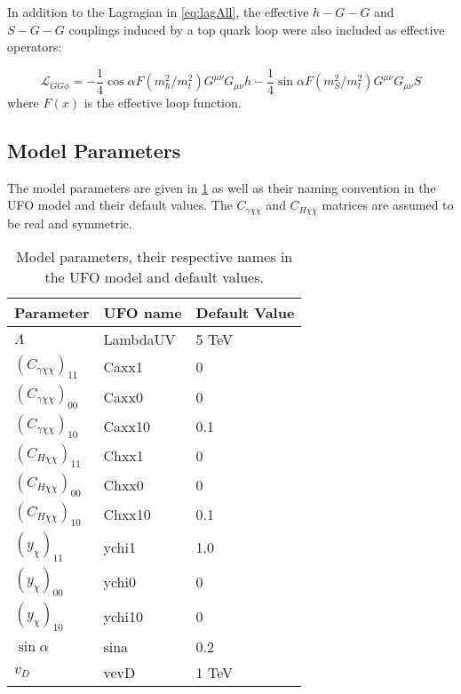 \documentclass[a4paper,11pt]{article}
\begin{document}
In addition to the Lagragian in \cref{eq:lagAll}, the effective $h-G-G$ and $S-G-G$ couplings induced by a top quark loop were also included as effective operators:

\begin{equation*}
	\mathcal{L}_{GG\phi} = -\frac{1}{4} \cos\alpha F(m_h^2/m_t^2) G^{\mu\nu} G_{\mu\nu} h -\frac{1}{4} \sin\alpha F(m_S^2/m_t^2) G^{\mu\nu} G_{\mu\nu} S
\end{equation*}
where $F(x)$ is the effective loop function.
\subsection*{Model Parameters}

The model parameters are given in \cref{tab:parameters} as well as their naming convention in the UFO model and their default values. The $C_{\gamma \chi\chi}$ and $C_{H \chi\chi}$ matrices are assumed to be real and symmetric.


\begin{table}[h!]   \centering
	\vspace{0.2cm}
	\caption{Model parameters, their respective names in the UFO model and default values.\label{tab:parameters}}
	\begin{tabular}{p{2cm}|p{3cm}|p{3cm}}
		\toprule
		\textbf{Parameter} & \textbf{UFO name} & \textbf{Default Value}\\ \toprule 
		$\Lambda$  & LambdaUV & 5 TeV\\
		$(C_{\gamma \chi\chi})_{11}$  & Caxx1 & 0\\
		$(C_{\gamma \chi\chi})_{00}$  & Caxx0 & 0\\
		$(C_{\gamma \chi\chi})_{10}$  & Caxx10 & 0.1\\
		$(C_{H \chi\chi})_{11}$  & Chxx1 & 0\\
		$(C_{H \chi\chi})_{00}$  & Chxx0 & 0\\
		$(C_{H \chi\chi})_{10}$  & Chxx10 & 0.1\\
		$(y_\chi)_{11}$  & ychi1 & 1.0\\
		$(y_\chi)_{00}$  & ychi0 & 0\\
		$(y_\chi)_{10}$  & ychi10 & 0\\
		$\sin\alpha$  & sina & 0.2\\
		$v_D$  & vevD & 1 TeV\\
		\bottomrule        
	\end{tabular}
\end{table}
\end{document}
